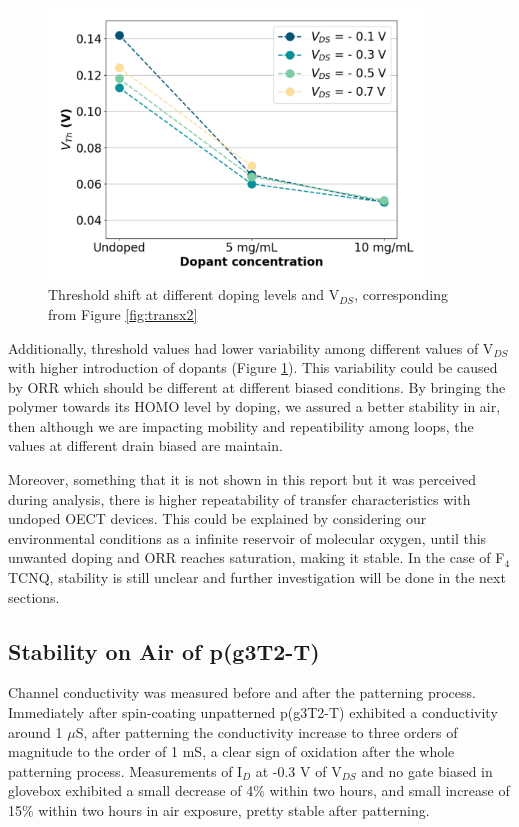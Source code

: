 \begin{figure}[ht]
  \centering
  \includegraphics[width=10cm]{Images/pdf/vth_shift_vds.pdf}
  \caption[Threshold shift at different doping levels and V$_{DS}$]{Threshold shift at different doping levels and V$_{DS}$, corresponding from Figure \ref{fig:transx2}}
  \label{fig:vth_vds}
\end{figure}

Additionally, threshold values had lower variability among different values of V$_{DS}$ with higher introduction of dopants (Figure \ref{fig:vth_vds}). This variability could be caused by ORR which should be different at different biased conditions. By bringing the polymer towards its HOMO level by doping, we assured a better stability in air, then although we are impacting mobility and repeatibility among loops, the values at different drain biased are maintain.

Moreover, something that it is not shown in this report but it was perceived during analysis, there is higher repeatability of transfer characteristics with undoped OECT devices. This could be explained by considering our environmental conditions as a infinite reservoir of molecular oxygen, until this unwanted doping and ORR reaches saturation, making it stable. In the case of F$_{4}$TCNQ, stability is still unclear and further investigation will be done in the next sections.

\subsection{Stability on Air of p(g3T2-T)}

Channel conductivity was measured before and after the patterning process. Immediately after spin-coating unpatterned p(g3T2-T) exhibited a conductivity around 1 $\mu$S, after patterning the conductivity increase to three orders of magnitude to the order of 1 mS, a clear sign of oxidation after the whole patterning process. Measurements of I$_{D}$ at -0.3 V of V$_{DS}$ and no gate biased in glovebox exhibited a small decrease of 4\% within two hours, and small increase of 15\% within two hours in air exposure, pretty stable after patterning.

